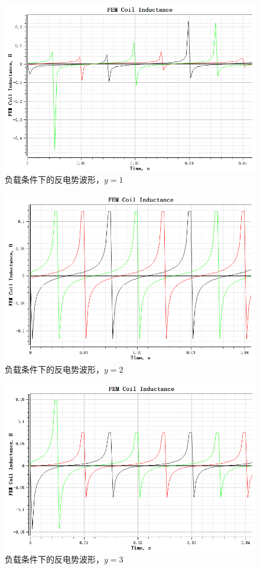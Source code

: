 \documentclass{thuemp}
\begin{document}
\begin{figure}[H]
  \centering
  \includegraphics[width=1\linewidth]{./img/task2/FEM-y1-load.png}
  \caption{负载条件下的反电势波形，$y=1$}
\end{figure}
\begin{figure}[H]
  \centering
  \includegraphics[width=1\linewidth]{./img/task2/FEM-y2-load.png}
  \caption{负载条件下的反电势波形，$y=2$}
\end{figure}
\begin{figure}[H]
  \centering
  \includegraphics[width=1\linewidth]{./img/task2/FEM-y3-load.png}
  \caption{负载条件下的反电势波形，$y=3$}
\end{figure}
\end{document}
